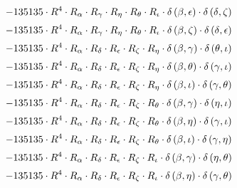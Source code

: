 \begin{subequations}
\begin{gather}
 \\[0.2em] \notag 		 - 135135 \cdot R^{4} \cdot R_{\alpha{}} \cdot R_{\gamma{}} \cdot R_{\eta{}} \cdot R_{\theta{}} \cdot R_{\iota{}} \cdot \delta{}\left(\beta{}, \epsilon{}\right) \cdot \delta{}\left(\delta{}, \zeta{}\right) 
 \\[0.2em] \notag 		 - 135135 \cdot R^{4} \cdot R_{\alpha{}} \cdot R_{\gamma{}} \cdot R_{\eta{}} \cdot R_{\theta{}} \cdot R_{\iota{}} \cdot \delta{}\left(\beta{}, \zeta{}\right) \cdot \delta{}\left(\delta{}, \epsilon{}\right) 
 \\[0.2em] \notag 		 - 135135 \cdot R^{4} \cdot R_{\alpha{}} \cdot R_{\delta{}} \cdot R_{\epsilon{}} \cdot R_{\zeta{}} \cdot R_{\eta{}} \cdot \delta{}\left(\beta{}, \gamma{}\right) \cdot \delta{}\left(\theta{}, \iota{}\right) 
 \\[0.2em] \notag 		 - 135135 \cdot R^{4} \cdot R_{\alpha{}} \cdot R_{\delta{}} \cdot R_{\epsilon{}} \cdot R_{\zeta{}} \cdot R_{\eta{}} \cdot \delta{}\left(\beta{}, \theta{}\right) \cdot \delta{}\left(\gamma{}, \iota{}\right) 
 \\[0.2em] \notag 		 - 135135 \cdot R^{4} \cdot R_{\alpha{}} \cdot R_{\delta{}} \cdot R_{\epsilon{}} \cdot R_{\zeta{}} \cdot R_{\eta{}} \cdot \delta{}\left(\beta{}, \iota{}\right) \cdot \delta{}\left(\gamma{}, \theta{}\right) 
 \\[0.2em] \notag 		 - 135135 \cdot R^{4} \cdot R_{\alpha{}} \cdot R_{\delta{}} \cdot R_{\epsilon{}} \cdot R_{\zeta{}} \cdot R_{\theta{}} \cdot \delta{}\left(\beta{}, \gamma{}\right) \cdot \delta{}\left(\eta{}, \iota{}\right) 
 \\[0.2em] \notag 		 - 135135 \cdot R^{4} \cdot R_{\alpha{}} \cdot R_{\delta{}} \cdot R_{\epsilon{}} \cdot R_{\zeta{}} \cdot R_{\theta{}} \cdot \delta{}\left(\beta{}, \eta{}\right) \cdot \delta{}\left(\gamma{}, \iota{}\right) 
 \\[0.2em] \notag 		 - 135135 \cdot R^{4} \cdot R_{\alpha{}} \cdot R_{\delta{}} \cdot R_{\epsilon{}} \cdot R_{\zeta{}} \cdot R_{\theta{}} \cdot \delta{}\left(\beta{}, \iota{}\right) \cdot \delta{}\left(\gamma{}, \eta{}\right) 
 \\[0.2em] \notag 		 - 135135 \cdot R^{4} \cdot R_{\alpha{}} \cdot R_{\delta{}} \cdot R_{\epsilon{}} \cdot R_{\zeta{}} \cdot R_{\iota{}} \cdot \delta{}\left(\beta{}, \gamma{}\right) \cdot \delta{}\left(\eta{}, \theta{}\right) 
 \\[0.2em] \notag 		 - 135135 \cdot R^{4} \cdot R_{\alpha{}} \cdot R_{\delta{}} \cdot R_{\epsilon{}} \cdot R_{\zeta{}} \cdot R_{\iota{}} \cdot \delta{}\left(\beta{}, \eta{}\right) \cdot \delta{}\left(\gamma{}, \theta{}\right) 

\end{gather}
\end{subequations}
